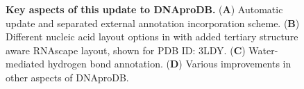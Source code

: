 \begin{center}
    \begin{figure}
        \caption[Key aspects of this update to DNAproDB.]{\textbf{Key aspects of this update to DNAproDB.} ({\bf A}) Automatic update and separated external annotation incorporation scheme.  ({\bf B})  Different nucleic acid layout options in with added tertiary structure aware RNAscape layout, shown for PDB ID: 3LDY. ({\bf C}) Water-mediated hydrogen bond annotation. ({\bf D}) Various improvements in other aspects of DNAproDB. }
  \label{fig:rnaprodb3}
\end{figure}
\end{center}